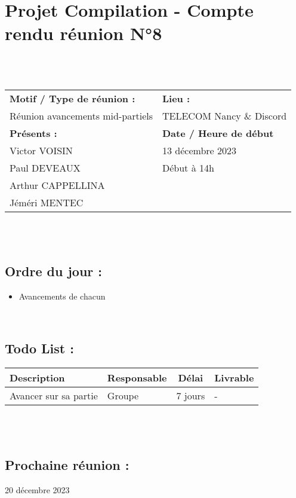 \documentclass{article}
\begin{document}
\section*{Projet Compilation - Compte rendu réunion N°8}
~\\\\

\begin{tabular}{|p{7cm}|p{6cm}|}
    \hline
    \textbf{Motif / Type de réunion :}
    & \textbf{Lieu :}
    \\
    Réunion avancements mid-partiels
    &
    TELECOM Nancy \& Discord
    \\ \hline
    \textbf{Présents :}
    &
    \textbf{Date / Heure de début}
    \\
    Victor VOISIN &  13 décembre 2023\\
    Paul DEVEAUX & Début à 14h\\
    Arthur CAPPELLINA & \\
    Jéméri MENTEC &
    \\ \hline
\end{tabular}
\\\\

\subsection*{Ordre du jour :}
\begin{itemize}
    \item{Avancements de chacun}
\end{itemize}
~

\subsection*{Todo List :}
\renewcommand{\arraystretch}{1.5}
\begin{tabular}{|p{5cm}|l|c|p{4.5cm}|}
    \hline
    Description & Responsable & Délai & Livrable\\ 
    \hline
    Avancer sur sa partie & Groupe  & 7 jours & - \\
    \hline
\end{tabular}
\\\\

\subsection*{Prochaine réunion :} 20 décembre 2023
\end{document}

